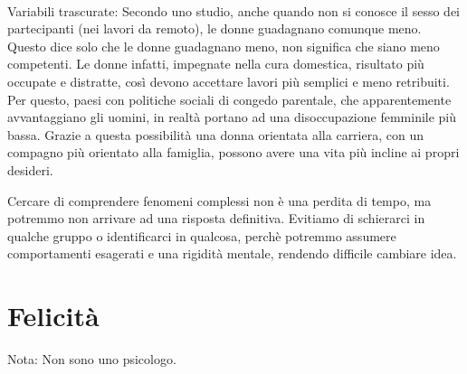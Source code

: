 \documentclass[12pt]{book} %
\begin{document}
\begin{mdframed}[linewidth=1pt]
\begin{itemize}
\\Variabili trascurate: Secondo uno studio, anche quando non si conosce il sesso dei partecipanti (nei lavori da remoto), le donne guadagnano comunque meno. Questo dice solo che le donne guadagnano meno, non significa che siano meno competenti. Le donne infatti, impegnate nella cura domestica, risultato più occupate e distratte, così devono accettare lavori più semplici e meno retribuiti. Per questo, paesi con politiche sociali di congedo parentale, che apparentemente avvantaggiano gli uomini, in realtà portano ad una disoccupazione femminile più bassa. Grazie a questa possibilità una donna orientata alla carriera, con un compagno più orientato alla famiglia, possono avere una vita più incline ai propri desideri. 
\end{itemize}

Cercare di comprendere fenomeni complessi non è una perdita di tempo, ma potremmo non arrivare ad una risposta definitiva.
Evitiamo di schierarci in qualche gruppo o identificarci in qualcosa, perchè potremmo assumere comportamenti esagerati e una rigidità mentale, rendendo difficile cambiare idea.
\end{mdframed}

\clearpage\section{Felicità}
Nota: Non sono uno psicologo.
\end{document}
